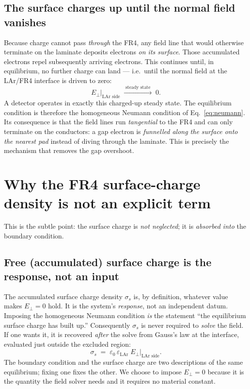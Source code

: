 \documentclass[11pt]{article}
\newcommand{\En}{E_{\perp}}
\begin{document}
\subsection{The surface charges up until the normal field vanishes}
Because charge cannot pass \emph{through} the FR4, any field line that would
otherwise terminate on the laminate deposits electrons \emph{on its surface}. Those
accumulated electrons repel subsequently arriving electrons. This continues until,
in equilibrium, no further charge can land --- i.e.\ until the normal field at the
LAr/FR4 interface is driven to zero:
\begin{equation}
  \En\big|_{\text{LAr side}} \;\xrightarrow{\;\text{steady state}\;}\; 0 .
\end{equation}
A detector operates in exactly this charged-up steady state. The equilibrium
condition is therefore the homogeneous Neumann condition of
Eq.~\eqref{eq:neumann}. Its consequence is that the field lines run \emph{tangential}
to the FR4 and can only terminate on the conductors: a gap electron is
\emph{funnelled along the surface onto the nearest pad} instead of diving through
the laminate. This is precisely the mechanism that removes the gap overshoot.

\section{Why the FR4 surface-charge density is not an explicit term}

This is the subtle point: the surface charge is \emph{not neglected}; it is
\emph{absorbed into} the boundary condition.

\subsection{Free (accumulated) surface charge is the response, not an input}
The accumulated surface charge density $\sigma_s$ is, by definition, whatever value
makes $\En=0$ hold. It is the system's \emph{response}, not an independent datum.
Imposing the homogeneous Neumann condition \emph{is} the statement ``the equilibrium
surface charge has built up.'' Consequently $\sigma_s$ is never required to
\emph{solve} the field. If one wants it, it is recovered \emph{after} the solve from
Gauss's law at the interface, evaluated just outside the excluded region:
\begin{equation}
  \sigma_s \;=\; \varepsilon_0\,\varepsilon_{\mathrm{LAr}}\;
               \En\big|_{\text{LAr side}} .
  \label{eq:gauss}
\end{equation}
The boundary condition and the surface charge are two descriptions of the same
equilibrium; fixing one fixes the other. We choose to impose $\En=0$ because it is
the quantity the field solver needs and it requires no material constant.
\end{document}
